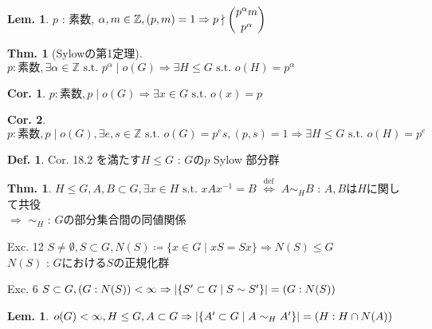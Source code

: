 \documentclass[uplatex,dvipdfmx,9pt]{beamer}
\newcommand{\defarrow}{\overset{\mathrm{def}}{\Leftrightarrow}}
\newcommand{\inverse}[1]{#1^{-1}}
\newcommand{\st}{\text{ s.t. }}
\newcommand{\lt}{\ensuremath <}
\newcounter{textThmCount}
\newcounter{textLemCount}
\theoremstyle{definition} %
\newtheorem{defn}{Def.}[subsection] %
\newtheorem{thm}{Thm.}[subsection] %
\newtheorem{lem}{Lem.}[subsection] %
\newtheorem{thmText}[textThmCount]{Thm.}
\newtheorem{corText}{Cor.}[textThmCount] %
\newtheorem{lemText}[textLemCount]{Lem.} %
\theoremstyle{example}
\begin{document}
      \begin{frame}

        \begin{lem}
          $p$ : 素数, $\alpha, m \in \mathbb{Z}, (p, m) = 1 \Rightarrow p \nmid \dbinom{p^\alpha m}{p^\alpha} $
        \end{lem}

        \begin{thmText}[Sylowの第1定理]
          $p : \text{素数}, \exists \alpha \in \mathbb{Z} \st p^\alpha \mid o(G) \Rightarrow \exists H \le G \st o(H) = p^\alpha$
        \end{thmText}

        \begin{corText}
          $p : \text{素数}, p \mid o(G) \Rightarrow \exists x \in G \st o(x) = p$
        \end{corText}

        \begin{corText}
          $p : \text{素数}, p \mid o(G), \exists e, s \in \mathbb{Z}  \st o(G) = p^es, (p, s) = 1 \Rightarrow \exists H \le G \st o(H) = p^e$
        \end{corText}

        \begin{defn}
          Cor. 18.2 を満たす$H \le G$ : $G$の\alert{$p$ Sylow 部分群}
        \end{defn}

      \end{frame}

      \begin{frame}
        
        \begin{thm}
          $H \le G, A, B \subset G, \exists x \in H \st xA\inverse{x} = B$ $\defarrow$ $A \sim_H B$ : $A,B$は$H$に関して共役 \\
          $\Rightarrow$ $\sim_H$ : $G$の部分集合間の同値関係
        \end{thm}

        \begin{exampleblock}{ Exc. 12}
          $S \ne \emptyset, S \subset G, N(S) \coloneqq \{ x \in G \mid xS = Sx \} \Rightarrow N(S) \le G$ \\
          $N(S)$ : $G$における$S$の\alert{正規化群}
        \end{exampleblock}

        \begin{exampleblock}{ Exc. 6}
          $S \subset G, (G : N(S)) \lt \infty \Rightarrow |\{ S' \subset G \mid S \sim S' \}| = (G : N(S))$ \\
        \end{exampleblock}

        \begin{lemText}
          $o(G) \lt \infty, H \le G, A \subset G \Rightarrow |\{ A' \subset G \mid A \sim_H A' \}| = (H : H \cap N(A))$
        \end{lemText}

      \end{frame}
\end{document}
